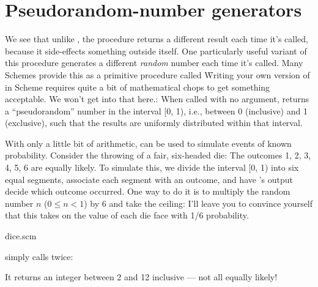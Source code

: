 \section{Pseudorandom-number generators}

We see that unlike , the procedure 
returns a different result each time it’s called, because it
side-effects something outside itself. One particularly useful
variant of this procedure generates a different {\em random}
number each time it’s called. Many Schemes provide this as a
primitive procedure called \f{Writing your own version
of  in Scheme requires quite a bit of mathematical
chops to get something acceptable. We won’t get into that here.}:
When called with no argument,  returns a
“pseudorandom” number in the interval [0, 1), i.e., between 0
(inclusive) and 1 (exclusive), such that the results are
uniformly distributed within that interval.


\n With only a little bit of arithmetic,  can be used
to simulate events of known probability. Consider the throwing of
a fair, six-headed die: The outcomes 1, 2, 3, 4, 5, 6 are equally
likely. To simulate this, we divide the interval [0, 1) into six
equal segments, associate each segment with an outcome, and have
’s output decide which outcome occurred. One way to
do it is to multiply the random number $n$ ($0 \le n < 1$) by 6
and take the ceiling: I'll leave you to convince yourself that
this takes on the value of each die face with 1/6 probability.

\scmfilename dice.scm


\n {} simply calls  twice:


\n It returns an integer between 2 and 12 inclusive — not all
equally likely!
